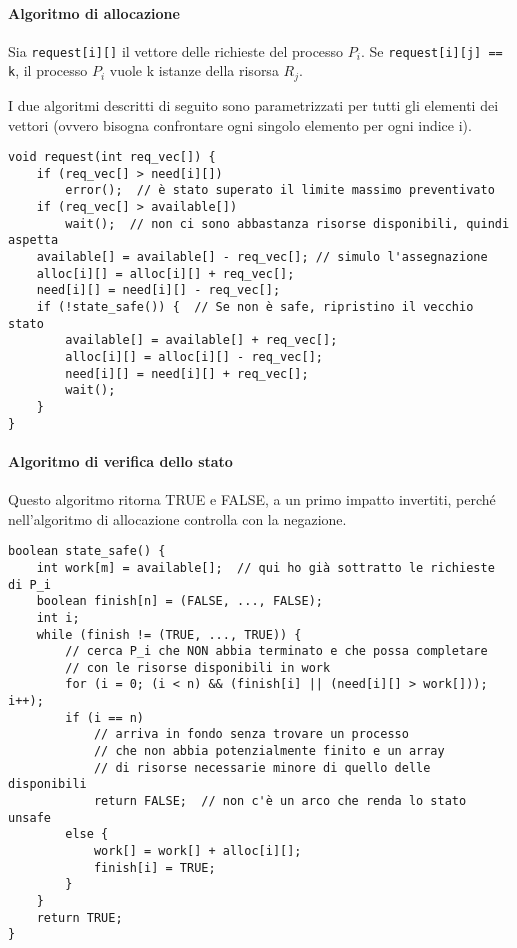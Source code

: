 \documentclass[a4paper]{article}
\begin{document}
\paragraph{Algoritmo di allocazione}
Sia \verb|request[i][]| il vettore delle richieste del processo $P_i$. Se \verb|request[i][j] == k|, il processo $P_i$ vuole k istanze della risorsa $R_j$. 

I due algoritmi descritti di seguito sono parametrizzati per tutti gli elementi dei vettori (ovvero bisogna confrontare ogni singolo elemento per ogni indice i).
\begin{Verbatim}[tabsize=4]
void request(int req_vec[]) {
    if (req_vec[] > need[i][])
        error();  // è stato superato il limite massimo preventivato
    if (req_vec[] > available[])
        wait();  // non ci sono abbastanza risorse disponibili, quindi aspetta
    available[] = available[] - req_vec[]; // simulo l'assegnazione
    alloc[i][] = alloc[i][] + req_vec[];
    need[i][] = need[i][] - req_vec[];
    if (!state_safe()) {  // Se non è safe, ripristino il vecchio stato
        available[] = available[] + req_vec[];
        alloc[i][] = alloc[i][] - req_vec[];
        need[i][] = need[i][] + req_vec[];
        wait();
    }
}
\end{Verbatim}

\paragraph{Algoritmo di verifica dello stato}
Questo algoritmo ritorna TRUE e FALSE, a un primo impatto invertiti, perché nell'algoritmo di allocazione controlla con la negazione.

\begin{Verbatim}[tabsize=4]
boolean state_safe() {
    int work[m] = available[];  // qui ho già sottratto le richieste di P_i
    boolean finish[n] = (FALSE, ..., FALSE);
    int i;
    while (finish != (TRUE, ..., TRUE)) {
        // cerca P_i che NON abbia terminato e che possa completare
        // con le risorse disponibili in work
        for (i = 0; (i < n) && (finish[i] || (need[i][] > work[])); i++);
        if (i == n)  
            // arriva in fondo senza trovare un processo
            // che non abbia potenzialmente finito e un array
            // di risorse necessarie minore di quello delle disponibili
            return FALSE;  // non c'è un arco che renda lo stato unsafe
        else {
            work[] = work[] + alloc[i][];
            finish[i] = TRUE;
        }
    }
    return TRUE;
}
\end{Verbatim}
\end{document}

